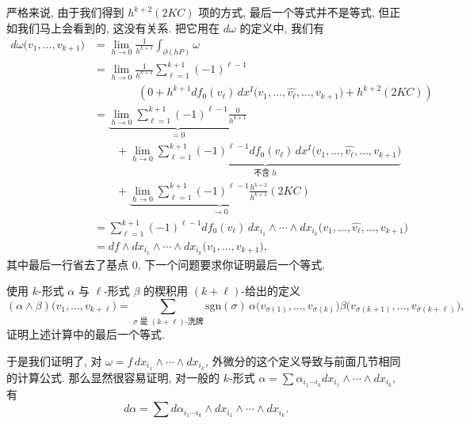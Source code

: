 严格来说, 由于我们得到 $h^{k+2}(2KC)$ 项的方式, 最后一个等式并不是等式, 但正如我们马上会看到的, 这没有关系. 把它用在 $d\omega$ 的定义中, 我们有
\begin{align*}
d\omega\bigl(v_1,\ldots,v_{k+1}\bigr)
&=\lim_{h\to 0}\frac{1}{h^{k+1}}\int_{\partial(hP)}\omega\\
&=\lim_{h\to 0}\frac{1}{h^{k+1}}\sum_{\ell=1}^{k+1}(-1)^{\ell-1}\\
&\qquad\qquad\left(0+h^{k+1}df_0(v_\ell)\,dx^I\bigl(v_1,\ldots,\widehat{v_\ell},\ldots,v_{k+1}\bigr)+h^{k+2}(2KC)\right)\\
&=\underbrace{\lim_{h\to 0}\sum_{\ell=1}^{k+1}(-1)^{\ell-1}\frac{0}{h^{k+1}}}_{=0}\\
&\qquad+\underbrace{\lim_{h\to 0}\sum_{\ell=1}^{k+1}(-1)^{\ell-1}df_0(v_\ell)\,dx^I\bigl(v_1,\ldots,\widehat{v_\ell},\ldots,v_{k+1}\bigr)}_{\text{不含 }h}\\
&\qquad+\underbrace{\lim_{h\to 0}\sum_{\ell=1}^{k+1}(-1)^{\ell-1}\frac{h^{k+2}}{h^{k+1}}(2KC)}_{\to 0}\\
&=\sum_{\ell=1}^{k+1}(-1)^{\ell-1}df_0(v_\ell)\,dx_{i_1}\wedge\cdots\wedge dx_{i_k}\bigl(v_1,\ldots,\widehat{v_\ell},\ldots,v_{k+1}\bigr)\\
&=df\wedge dx_{i_1}\wedge\cdots\wedge dx_{i_k}\bigl(v_1,\ldots,v_{k+1}\bigr),
\end{align*}
其中最后一行省去了基点 0. 下一个问题要求你证明最后一个等式.

\begin{question}\label{q:4-8}
使用 $k$-形式 $\alpha$ 与 $\ell$-形式 $\beta$ 的楔积用 $(k+\ell)$-给出的定义
\[
(\alpha\wedge\beta)\bigl(v_1,\ldots,v_{k+\ell}\bigr)
=\sum_{\sigma\text{ 是 }(k+\ell)\text{-洗牌}}\mathrm{sgn}(\sigma)\,
\alpha\bigl(v_{\sigma(1)},\ldots,v_{\sigma(k)}\bigr)\beta\bigl(v_{\sigma(k+1)},\ldots,v_{\sigma(k+\ell)}\bigr),
\]
证明上述计算中的最后一个等式.
\end{question}

于是我们证明了, 对 $\omega=f\,dx_{i_1}\wedge\cdots\wedge dx_{i_k}$, 外微分的这个定义导致与前面几节相同的计算公式. 那么显然很容易证明, 对一般的 $k$-形式 $\alpha=\sum \alpha_{i_1\cdots i_k}dx_{i_1}\wedge\cdots\wedge dx_{i_k}$, 有
\[
d\alpha=\sum d\alpha_{i_1\cdots i_k}\wedge dx_{i_1}\wedge\cdots\wedge dx_{i_k}.
\]

